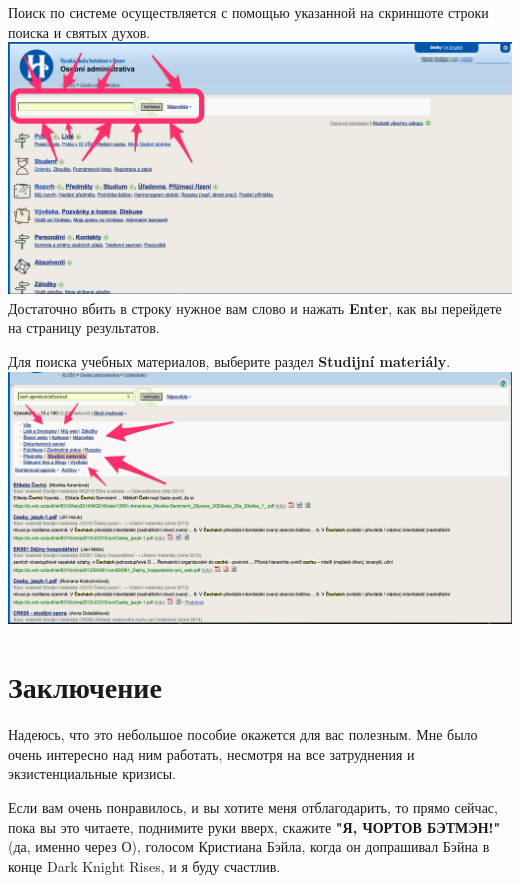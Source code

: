 \documentclass[a4paper,12pt]{article}
\begin{document}
Поиск по системе осуществляется с помощью указанной на скриншоте строки
поиска и святых духов. \\

\includegraphics[width=\textwidth]{s20} \\

Достаточно вбить в строку нужное вам слово и нажать \textbf{Enter}, 
как вы перейдете на страницу результатов.

Для поиска учебных материалов, выберите раздел \textbf{Studijní materiály}. \\

\includegraphics[width=\textwidth]{s21} \\



\newpage

\section{Заключение}

Надеюсь, что это небольшое пособие окажется для вас полезным. 
Мне было очень интересно над ним работать, несмотря на все затруднения 
и экзистенциальные кризисы.

Если вам очень понравилось, и вы хотите меня отблагодарить,
то прямо сейчас, пока вы это читаете, поднимите руки вверх, 
скажите \textbf{"Я, ЧОРТОВ БЭТМЭН!"} (да, именно через О), голосом Кристиана Бэйла, 
когда он допрашивал Бэйна в конце Dark Knight Rises, и я буду счастлив. \\
\end{document}
